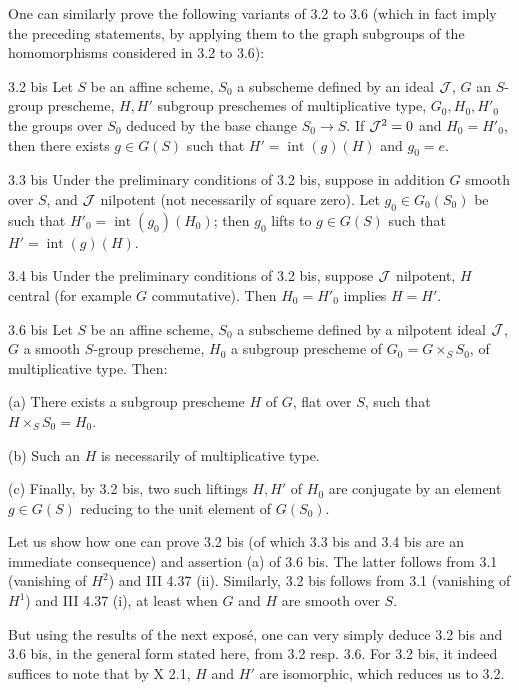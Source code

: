 One can similarly prove the following variants of 3.2 to 3.6 (which in fact imply the preceding statements, by applying them to the graph subgroups of the homomorphisms considered in 3.2 to 3.6):
\begin{theorem}{3.2 bis}\label{IX.3.2bis}
Let $S$ be an affine scheme, $S_0$ a subscheme defined by an ideal $\cal J$, $G$ an $S$-group prescheme, $H,H'$ subgroup preschemes of multiplicative type, $G_0,H_0,H'_0$ the groups over $S_0$ deduced by the base change $S_0\to S$. If $\cal J^2=0$ and $H_0=H'_0$, then there exists $g\in G(S)$ such that $H'=\operatorname{int}(g)(H)$ and $g_0=e$.
\end{theorem}
\begin{corollary}{3.3 bis}\label{IX.3.3bis}
Under the preliminary conditions of 3.2 bis, suppose in addition $G$ smooth over $S$, and $\cal J$ nilpotent (not necessarily of square zero). Let $g_0\in G_0(S_0)$ be such that $H'_0=\operatorname{int}(g_0)(H_0)$; then $g_0$ lifts to $g\in G(S)$ such that $H'=\operatorname{int}(g)(H)$.
\end{corollary}
\begin{corollary}{3.4 bis}\label{IX.3.4bis}
Under the preliminary conditions of 3.2 bis, suppose $\cal J$ nilpotent, $H$ central (for example $G$ commutative). Then $H_0=H'_0$ implies $H=H'$.
\end{corollary}
\begin{theorem}{3.6 bis}\label{IX.3.6bis}
Let $S$ be an affine scheme, $S_0$ a subscheme defined by a nilpotent ideal $\cal J$, $G$ a smooth $S$-group prescheme, $H_0$ a subgroup prescheme of $G_0=G\times_S S_0$, of multiplicative type. Then:

(a) There exists a subgroup prescheme $H$ of $G$, flat over $S$, such that $H\times_S S_0=H_0$.

(b) Such an $H$ is necessarily of multiplicative type.

(c) Finally, by 3.2 bis, two such liftings $H,H'$ of $H_0$ are conjugate by an element $g\in G(S)$ reducing to the unit element of $G(S_0)$.
\end{theorem}
Let us show how one can prove 3.2 bis (of which 3.3 bis and 3.4 bis are an immediate consequence) and assertion (a) of 3.6 bis. The latter follows from 3.1 (vanishing of $H^2$) and III 4.37 (ii). Similarly, 3.2 bis follows from 3.1 (vanishing of $H^1$) and III 4.37 (i), at least when $G$ and $H$ are smooth over $S$.

But using the results of the next expos\'e, one can very simply deduce 3.2 bis and 3.6 bis, in the general form stated here, from 3.2 resp. 3.6. For 3.2 bis, it indeed suffices to note that by X 2.1, $H$ and $H'$ are isomorphic, which reduces us to 3.2.

